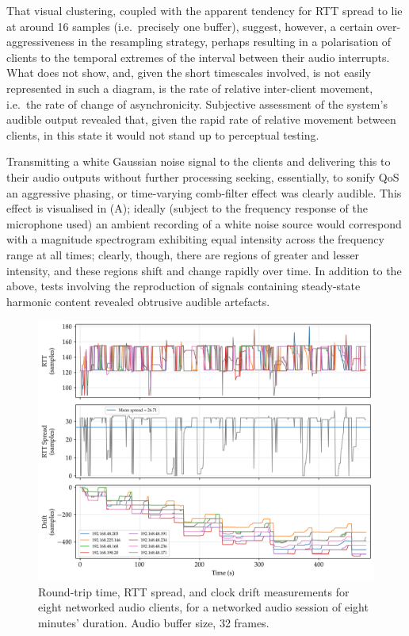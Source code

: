 That visual clustering, coupled with the apparent tendency for RTT spread to
lie at around 16 samples (i.e.\ precisely one buffer), suggest, however, a
certain over-aggressiveness in the resampling strategy, perhaps resulting in a
polarisation of clients to the temporal extremes of the interval between their
audio interrupts.
What  does not show, and, given the short timescales
involved, is not easily represented in such a diagram, is the rate of relative
inter-client movement, i.e.\ the rate of change of asynchronicity.
Subjective assessment of the system's audible output revealed that, given the
rapid rate of relative movement between clients, in this state it would not
stand up to perceptual testing.

Transmitting a white Gaussian noise signal to the clients and delivering this to
their audio outputs without further processing \textemdash{} seeking,
essentially, to sonify QoS \textemdash{} an aggressive phasing, or time-varying
comb-filter effect was clearly audible.
This effect is visualised in (A);
ideally (subject to the frequency response of the microphone used) an ambient
recording of a white noise source would correspond with a magnitude spectrogram
exhibiting equal intensity across the frequency range at all times;
clearly, though, there are regions of greater and lesser intensity, and these
regions shift and change rapidly over time.
In addition to the above, tests involving the reproduction of signals
containing steady-state harmonic content revealed obtrusive audible artefacts.

\begin{figure}[h]
    \centering
    \includegraphics[width=\textwidth]{figures/rtt_drift_32}
    \caption{
        Round-trip time, RTT spread, and clock drift measurements
        for eight networked audio clients, for a networked audio session of
        eight minutes' duration.
        Audio buffer size, 32 frames.
    }
    \label{fig:rtt-drift-32}
\end{figure}


